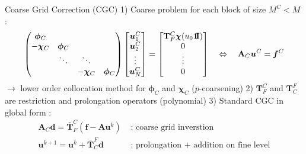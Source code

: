 \documentclass[11pt,aspectratio=43]{beamer}
\newcommand{\ones}{\mbox{1\hspace{-0.2em}I}}
\newcommand{\matr}[1]{\mathbf{#1}}
\newcommand{\vect}[1]{\boldsymbol{#1}}
\newcommand{\uvect}{\vect{u}}
\newcommand{\TFtoCBar}{\bar{\matr{T}}_F^C}
\newcommand{\TCtoFBar}{\bar{\matr{T}}_C^F}
\newcommand{\TFtoC}{\matr{T}_F^C}
\newcommand{\TCtoF}{\matr{T}_C^F}
\newcommand{\AMat}{\matr{A}}
\newcommand{\chiOp}{\bm{\chi}}
\newcommand{\CoarseId}{C}
\newcommand{\uCoarse}{\vect{u}^\CoarseId}
\newcommand{\ACoarse}{\matr{A}_\CoarseId}
\newcommand{\chiCoarse}{\bm{\chi}_\CoarseId}
\newcommand{\phiCoarse}{\bm{\phi}_\CoarseId}
\begin{document}
\begin{frame}{Coarse Grid Correction (CGC)}
	1) Coarse problem for each block of size $M^C < M$ :
	\begin{equation*}\label{eq:globalCoarseProblem}
		\begin{pmatrix}
			\phiCoarse & & &\\
			-\chiCoarse & \phiCoarse & &\\
			& \ddots & \ddots &\\
			& & -\chiCoarse & \phiCoarse
		\end{pmatrix}
		\begin{bmatrix}
			\uCoarse_{1}\\\uCoarse_{2}\\\vdots\\\uCoarse_{N}
		\end{bmatrix}
		=
		\begin{bmatrix}
			\TFtoC\chiOp(u_0\vect{\ones})\\0\\\vdots\\0
		\end{bmatrix}
		\quad \Leftrightarrow \quad
		\ACoarse\uCoarse = \vect{f}^\CoarseId
	\end{equation*}
	$\rightarrow$ lower order collocation method for $\phiCoarse$ and $\chiCoarse$ ($p$-coarsening)\vskip10pt
	2) $\TFtoC$ and $\TCtoF$ are restriction and prolongation operators (polynomial)\vskip10pt
	3) Standard CGC in global form :
	\begin{align*}
		\ACoarse\vect{d} = \TFtoCBar (\vect{f}-\AMat\uvect^{k})
		&\text{ : coarse grid inverstion}\\
		\uvect^{k+1} = \uvect^{k} + \TCtoFBar\vect{d}
		&\text{ : prolongation + addition on fine level}
	\end{align*}\vspace{-40pt}
\end{frame}
\end{document}
